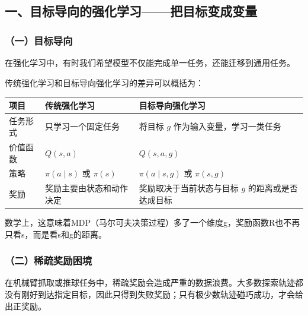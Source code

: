 \hypertarget{ux4e00ux76eeux6807ux5bfcux5411ux7684ux5f3aux5316ux5b66ux4e60ux628aux76eeux6807ux53d8ux6210ux53d8ux91cf}{%
\subsection{一、目标导向的强化学习------把目标变成变量}\label{ux4e00ux76eeux6807ux5bfcux5411ux7684ux5f3aux5316ux5b66ux4e60ux628aux76eeux6807ux53d8ux6210ux53d8ux91cf}}

\hypertarget{ux4e00ux76eeux6807ux5bfcux5411}{%
\subsubsection{（一）目标导向}\label{ux4e00ux76eeux6807ux5bfcux5411}}

在强化学习中，有时我们希望模型不仅能完成单一任务，还能迁移到通用任务。

传统强化学习和目标导向强化学习的差异可以概括为：

\begin{longtable}[]{@{}
  >{\raggedright\arraybackslash}p{}
  >{\raggedright\arraybackslash}p{}
  >{\raggedright\arraybackslash}p{}@{}}
\toprule
项目 & 传统强化学习 & 目标导向强化学习 \\
\midrule
\endhead
任务形式 & 只学习一个固定任务 & 将目标 \(g\) 作为输入变量，学习一类任务 \\
价值函数 & \(Q(s,a)\) & \(Q(s,a,g)\) \\
策略 & \(\pi(a\mid s)\) 或 \(\pi(s)\) & \(\pi(a\mid s,g)\) 或 \(\pi(s,g)\) \\
奖励 & 奖励主要由状态和动作决定 & 奖励取决于当前状态与目标 \(g\) 的距离或是否达成目标 \\
\bottomrule
\end{longtable}

数学上，这意味着MDP（马尔可夫决策过程）多了一个维度g，奖励函数R也不再只看s，而是看s和g的距离。

\hypertarget{ux4e8cux7a00ux758fux5956ux52b1ux56f0ux5883}{%
\subsubsection{（二）稀疏奖励困境}\label{ux4e8cux7a00ux758fux5956ux52b1ux56f0ux5883}}

在机械臂抓取或推球任务中，稀疏奖励会造成严重的数据浪费。大多数探索轨迹都没有刚好到达指定目标，因此只得到失败奖励；只有极少数轨迹碰巧成功，才会给出正奖励。


